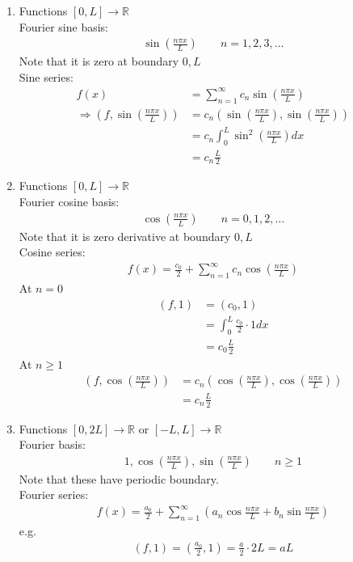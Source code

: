 \documentclass[12pt, letterpaper]{article}
\begin{document}
\begin{enumerate}
    \item Functions $[0,L]\rightarrow \mathbb{R}$ \\
    Fourier sine basis:
    \begin{align*}
        \sin\left(\frac{n\pi x}{L}\right) \qquad n = 1,2,3,\dots
    \end{align*}
    Note that it is zero at boundary $0,L$ \\
    Sine series:
    \begin{align*}
        f(x) &= \sum_{n=1}^{\infty} c_n \sin\left(\frac{n\pi x}{L}\right) \\
        \Rightarrow (f,\sin(\frac{n\pi x}{L})) &= c_n (\sin(\frac{n\pi x}{L}),\sin(\frac{n\pi x}{L})) \\
        &= c_n \int_{0}^{L} \sin^2(\frac{n\pi x}{L})dx \\
        &= c_n \frac{L}{2}
    \end{align*}
    \item Functions $[0,L] \rightarrow\mathbb{R}$ \\
    Fourier cosine basis:
    \begin{align*}
        \cos(\frac{n\pi x}{L}) \qquad n = 0,1,2,\dots
    \end{align*}
    Note that it is zero derivative at boundary $0,L$ \\
    Cosine series:
    \begin{align*}
        f(x) = \frac{c_0}{2} + \sum_{n=1}^{\infty}c_n \cos(\frac{n\pi x}{L})
    \end{align*}
    At $n = 0$
    \begin{align*}
        (f,1) &= (c_0, 1) \\
        &= \int_{0}^{L} \frac{c_0}{2}\cdot 1 dx \\
        &= c_0 \frac{L}{2}
    \end{align*}
    At $n \ge 1$
    \begin{align*}
        (f, \cos(\frac{n\pi x}{L})) &= c_n (\cos(\frac{n\pi x}{L}), \cos(\frac{n\pi x}{L}))\\
        &= c_n \frac{L}{2}
    \end{align*}
    \item Functions $[0,2L]\rightarrow\mathbb{R}$ or $[-L,L] \rightarrow\mathbb{R}$ \\
    Fourier basis:
    \begin{align*}
        1, \cos(\frac{n\pi x}{L}), \sin(\frac{n\pi x}{L})\qquad n \ge 1
    \end{align*}
    Note that these have periodic boundary. \\
    Fourier series:
    \begin{align*}
        f(x) = \frac{a_0}{2} + \sum_{n=1}^{\infty} (a_n \cos \frac{n\pi x}{L} + b_n \sin \frac{n\pi x}{L})
    \end{align*}
    e.g. 
    \begin{align*}
        (f,1) = (\frac{a_0}{2}, 1) = \frac{a}{2}\cdot 2L = aL
    \end{align*}
\end{enumerate}
\end{document}
